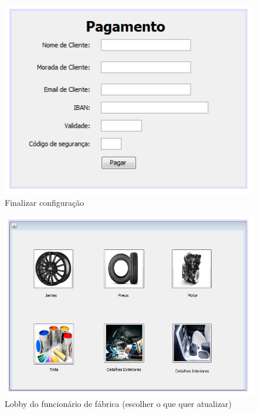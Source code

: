 \begin{figure}
    \centering
    \includegraphics[width=\textwidth]{analise_de_requisitos/img/config_finalizar.png}
    \caption{Finalizar configuração}
\end{figure}

\begin{figure}
    \centering
    \includegraphics[width=\textwidth]{analise_de_requisitos/img/lobby_fabrica.png}
    \caption{Lobby do funcionário de fábrica (escolher o que quer atualizar)}
\end{figure}


